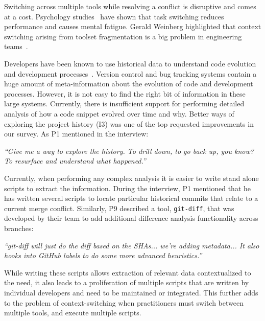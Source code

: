 Switching across multiple tools while resolving a conflict is disruptive and comes at a cost. Psychology studies~\cite{Meiran2000}\cite{gopher2000switching} have shown that task switching reduces performance and causes mental fatigue. 
Gerald Weinberg highlighted that context switching arising from toolset fragmentation is a big problem in engineering teams~\cite{Weinberg1992}. 


Developers have been known to use historical data to understand code evolution and development processes~\cite{Mihai_lenses}.
Version control and bug tracking systems contain a huge amount of meta-information about the evolution of code and development processes.
However, it is not easy to find the right bit of information in these large systems. 
Currently, there is insufficient support for performing detailed analysis of how a code snippet evolved over time and why. 
Better ways of exploring the project history (I3) was one of the top requested improvements in our survey. 
As P1 mentioned in the interview:
\begin{displayquote}
\textit{``Give me a way to explore the history. To drill down, to go back up, you know? To resurface and understand what happened.''}
\end{displayquote}


Currently, when performing any complex analysis it is easier to write stand alone scripts to extract the information. 
During the interview, P1 mentioned that he has written several scripts to locate particular historical commits that relate to a current merge conflict. 
Similarly, P9 described a tool, \texttt{git-diff}, that was developed by their team to add additional difference analysis functionality across branches:
\begin{displayquote}
\textit{``git-diff will just do the diff based on the SHAs... we're adding metadata... It also hooks into GitHub labels to do some more advanced heuristics.''}
\end{displayquote}

While writing these scripts allows extraction of relevant data contextualized to the need, it also leads to a proliferation of multiple scripts that are written by individual developers and need to be maintained or integrated.
This further adds to the problem of context-switching when practitioners must switch between multiple tools, and execute multiple scripts.


